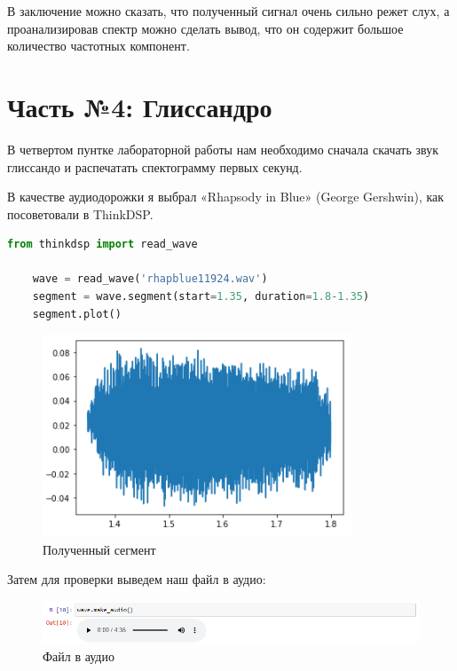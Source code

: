 \documentclass[a4paper]{article}
\begin{document}
            В заключение можно сказать, что полученный сигнал очень сильно режет слух, а проанализировав спектр можно сделать вывод, что он содержит большое количество частотных компонент.
            
    \newpage
        \section{Часть №4: Глиссандро}
            В четвертом пунтке лабораторной работы нам необходимо сначала скачать звук глиссандо и распечатать спектограмму первых секунд.
            
            В качестве аудиодорожки я выбрал «Rhapsody in Blue» (George Gershwin), как посоветовали в ThinkDSP.
            
\begin{lstlisting}[language=Python, caption= Получение сегмена из аудиофайла]
    from thinkdsp import read_wave

    wave = read_wave('rhapblue11924.wav')
    segment = wave.segment(start=1.35, duration=1.8-1.35)
    segment.plot()
\end{lstlisting}   
            
             \begin{figure}[H]
                \centering
                \includegraphics{ex_4_segment.png}
                \caption{Полученный сегмент}
                \label{fig:ex_4_segment}
            \end{figure}
            
            Затем для проверки выведем наш файл в аудио:
            
            \begin{figure}[H]
                \centering
                \includegraphics[width=\textwidth]{ex_4_wave_audio.png}
                \caption{Файл в аудио}
                \label{fig:ex_4_wave_audio}
            \end{figure}
            
\end{document}
